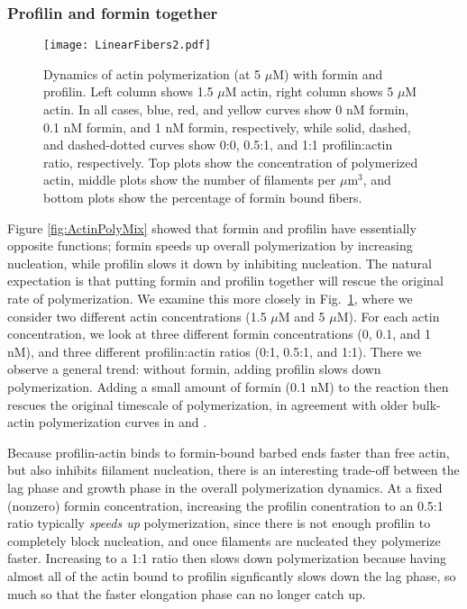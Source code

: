 \documentclass[11pt]{article}
\begin{document}
\subsubsection{Profilin and formin together}
\begin{figure}
\centering
\texttt{[image: LinearFibers2.pdf]}
\caption{\label{fig:ActinForProf}Dynamics of actin polymerization (at 5 $\mu$M) with formin and profilin. Left column shows 1.5 $\mu$M actin, right column shows 5 $\mu$M actin. In all cases, blue, red, and yellow curves show 0 nM formin, 0.1 nM formin, and 1 nM formin, respectively, while solid, dashed, and dashed-dotted curves show 0:0, 0.5:1, and 1:1 profilin:actin ratio, respectively. Top plots show the concentration of polymerized actin, middle plots show the number of filaments per $\mu$m$^3$, and bottom plots show the percentage of formin bound fibers.}
\end{figure}

Figure \ref{fig:ActinPolyMix} showed that formin and profilin have essentially opposite functions; formin speeds up overall polymerization by increasing nucleation, while profilin slows it down by inhibiting nucleation. The natural expectation is that putting formin and profilin together will rescue the original rate of polymerization. We examine this more closely in Fig.\ \ref{fig:ActinForProf}, where we consider two different actin concentrations (1.5 $\mu$M and 5 $\mu$M). For each actin concentration, we look at three different formin concentrations (0, 0.1, and 1 nM), and three different profilin:actin ratios (0:1, 0.5:1, and 1:1). There we observe a general trend: without formin, adding profilin slows down polymerization. Adding a small amount of formin (0.1 nM) to the reaction then rescues the original timescale of polymerization, in agreement with older bulk-actin polymerization curves in \cite[Fig.~2]{li2003mouse} and \cite[Fig.~6]{harris2004mouse}. 

Because profilin-actin binds to formin-bound barbed ends faster than free actin, but also inhibits fiilament nucleation, there is an interesting trade-off between the lag phase and growth phase in the overall polymerization dynamics. At a fixed (nonzero) formin concentration, increasing the profilin conentration to an 0.5:1 ratio typically \emph{speeds up} polymerization, since there is not enough profilin to completely block nucleation, and once filaments are nucleated they polymerize faster. Increasing to a 1:1 ratio then slows down polymerization because having almost all of the actin bound to profilin signficantly slows down the lag phase, so much so that the faster elongation phase can no longer catch up.
\end{document}
